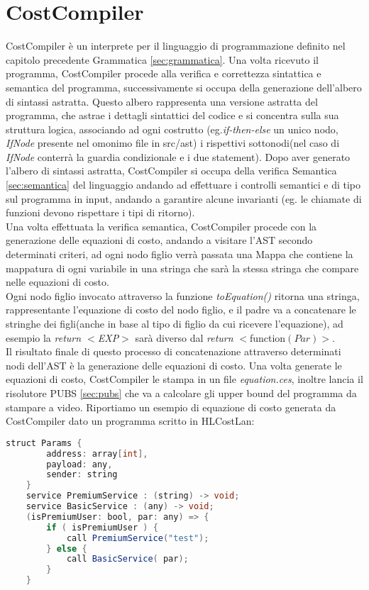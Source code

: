 \documentclass[../../main.tex]{subfiles}
\begin{document}
\chapter{CostCompiler}
CostCompiler è un interprete per il linguaggio di programmazione definito nel capitolo precedente Grammatica \ref{sec:grammatica}. Una volta ricevuto il programma, CostCompiler procede alla verifica e correttezza sintattica e semantica del programma, successivamente si occupa della generazione dell'albero di sintassi astratta. 
Questo albero rappresenta una versione astratta del programma, che astrae i dettagli sintattici del codice e si concentra sulla sua struttura logica, associando ad ogni costrutto (eg.\textit{if-then-else} un unico nodo, \textit{IfNode} presente nel omonimo file in src/ast) i rispettivi sottonodi(nel caso di \textit{IfNode} conterrà la guardia condizionale e i due statement).
Dopo aver generato l'albero di sintassi astratta, CostCompiler si occupa della verifica Semantica \ref{sec:semantica} del linguaggio andando ad effettuare i controlli semantici e di tipo sul programma in input, andando a garantire alcune invarianti (eg. le chiamate di funzioni devono rispettare i tipi di ritorno).\\
Una volta effettuata la verifica semantica, CostCompiler procede con la generazione delle equazioni di costo, andando a visitare l'AST secondo determinati criteri, ad ogni nodo figlio verrà passata una Mappa che contiene la mappatura di ogni variabile in una stringa che sarà la stessa stringa che compare nelle equazioni di costo.\\
Ogni nodo figlio invocato attraverso la funzione \textit{toEquation()} ritorna una stringa, rappresentante l'equazione di costo del nodo figlio, e il padre va a concatenare le stringhe dei figli(anche in base al tipo di figlio da cui ricevere l'equazione), ad esempio la \textit{return $<$EXP$>$ } sarà diverso dal \textit{return }$<$function$(Par)>$.\\
Il risultato finale di questo processo di concatenazione attraverso determinati nodi dell'AST è la generazione delle equazioni di costo. 
Una volta generate le equazioni di costo, CostCompiler le stampa in un file \textit{equation.ces}, inoltre lancia il risolutore PUBS \ref{sec:pubs} che va a calcolare gli upper bound del programma da stampare a video.
Riportiamo un esempio di equazione di costo generata da CostCompiler dato un programma scritto in HLCostLan:
    \begin{lstlisting}[language=Java, caption={Listing8}]
    struct Params {
        address: array[int],
        payload: any,
        sender: string
    }
    service PremiumService : (string) -> void;
    service BasicService : (any) -> void;
    (isPremiumUser: bool, par: any) => {
        if ( isPremiumUser ) {
            call PremiumService("test");
        } else {
            call BasicService( par);
        }
    }
\end{lstlisting}
\end{document}
